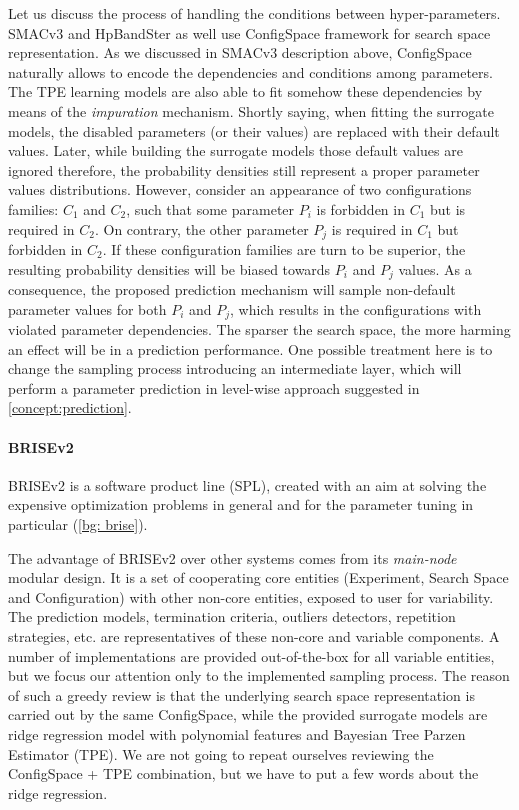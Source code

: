 Let us discuss the process of handling the conditions between hyper-parameters. SMACv3 and HpBandSter as well use ConfigSpace framework for search space representation. As we discussed in SMACv3 description above, ConfigSpace naturally allows to encode the dependencies and conditions among parameters. The TPE learning models are also able to fit somehow these dependencies by means of the \emph{impuration} mechanism\cite{levesque2017bayesian}. Shortly saying, when fitting the surrogate models, the disabled parameters (or their values) are replaced with their default values. Later, while building the surrogate models those default values are ignored therefore, the probability densities still represent a proper parameter values distributions. However, consider an appearance of two configurations families: $C_1$ and $C_2$, such that some parameter $P_i$ is forbidden in $C_1$ but is required in $C_2$. On contrary, the other parameter $P_j$ is required in $C_1$ but forbidden in $C_2$. If these configuration families are turn to be superior, the resulting probability densities will be biased towards $P_i$ and $P_j$ values. As a consequence, the proposed prediction mechanism will sample non-default parameter values for both $P_i$ and $P_j$, which results in the configurations with violated parameter dependencies. The sparser the search space, the more harming an effect will be in a prediction performance. One possible treatment here is to change the sampling process introducing an intermediate layer, which will perform a parameter prediction in level-wise approach suggested in \cref{concept:prediction}.

\paragraph{BRISEv2}
BRISEv2 is a software product line (SPL), created with an aim at solving the expensive optimization problems in general and for the parameter tuning in particular (\cref{bg: brise}).

The advantage of BRISEv2 over other systems comes from its \emph{main-node} modular design. It is a set of cooperating core entities (Experiment, Search Space and Configuration) with other non-core entities, exposed to user for variability. The prediction models, termination criteria, outliers detectors, repetition strategies, etc. are representatives of these non-core and variable components. A number of implementations are provided out-of-the-box for all variable entities, but we focus our attention only to the implemented sampling process. The reason of such a greedy review is that the underlying search space representation is carried out by the same ConfigSpace, while the provided surrogate models are ridge regression model with polynomial features and Bayesian Tree Parzen Estimator (TPE). We are not going to repeat ourselves reviewing the ConfigSpace + TPE combination, but we have to put a few words about the ridge regression.

